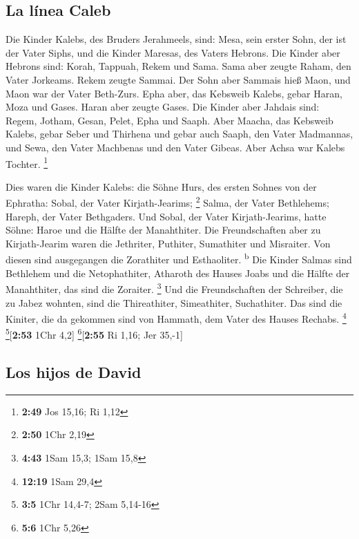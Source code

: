 \hypertarget{la-luxednea-caleb-1}{%
\subsection{La línea Caleb}\label{la-luxednea-caleb-1}}

 Die Kinder Kalebs, des Bruders Jerahmeels, sind: Mesa,
sein erster Sohn, der ist der Vater Siphs, und die Kinder Maresas, des
Vaters Hebrons.  Die Kinder aber Hebrons sind: Korah,
Tappuah, Rekem und Sama.  Sama aber zeugte Raham, den
Vater Jorkeams. Rekem zeugte Sammai.  Der Sohn aber
Sammais hieß Maon, und Maon war der Vater Beth-Zurs. 
Epha aber, das Kebsweib Kalebs, gebar Haran, Moza und Gases. Haran aber
zeugte Gases.  Die Kinder aber Jahdais sind: Regem,
Jotham, Gesan, Pelet, Epha und Saaph.  Aber Maacha, das
Kebsweib Kalebs, gebar Seber und Thirhena  und gebar auch
Saaph, den Vater Madmannas, und Sewa, den Vater Machbenas und den Vater
Gibeas. Aber Achsa war Kalebs Tochter. \footnote{\textbf{2:49} Jos
  15,16; Ri 1,12}

 Dies waren die Kinder Kalebs: die Söhne Hurs, des ersten
Sohnes von der Ephratha: Sobal, der Vater Kirjath-Jearims; \footnote{\textbf{2:50}
  1Chr 2,19}  Salma, der Vater Bethlehems; Hareph, der
Vater Bethgaders.  Und Sobal, der Vater Kirjath-Jearims,
hatte Söhne: Haroe und die Hälfte der Manahthiter.  Die
Freundschaften aber zu Kirjath-Jearim waren die Jethriter, Puthiter,
Sumathiter und Misraiter. Von diesen sind ausgegangen die Zorathiter und
Esthaoliter. \textsuperscript{b}  Die Kinder Salmas sind
Bethlehem und die Netophathiter, Atharoth des Hauses Joabs und die
Hälfte der Manahthiter, das sind die Zoraiter. \footnote{\textbf{4:43}
  1Sam 15,3; 1Sam 15,8}  Und die Freundschaften der
Schreiber, die zu Jabez wohnten, sind die Thireathiter, Simeathiter,
Suchathiter. Das sind die Kiniter, die da gekommen sind von Hammath, dem
Vater des Hauses Rechabs. \footnote{\textbf{12:19} 1Sam 29,4}
\footnote{\textbf{3:5} 1Chr 14,4-7; 2Sam 5,14-16}{[}\textbf{2:53} 1Chr
4,2{]} \footnote{\textbf{5:6} 1Chr 5,26}{[}\textbf{2:55} Ri 1,16; Jer
35,-1{]}

\hypertarget{los-hijos-de-david}{%
\subsection{Los hijos de David}\label{los-hijos-de-david}}

